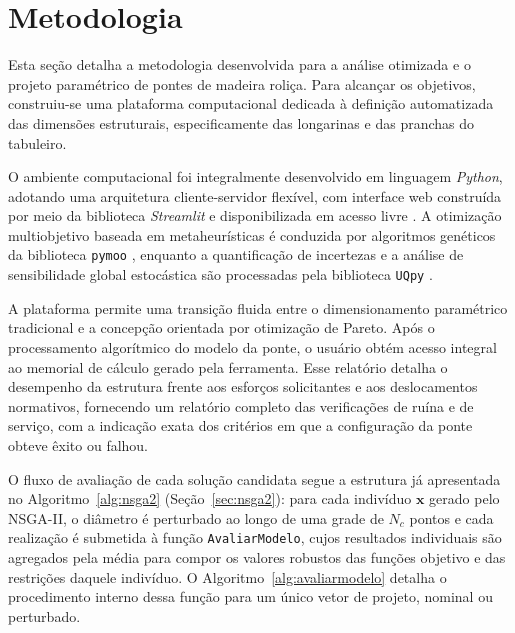 \section{Metodologia}\label{sec:metodologia}

Esta seção detalha a metodologia desenvolvida para a análise otimizada e o projeto paramétrico de pontes de madeira roliça. Para alcançar os objetivos, construiu-se uma plataforma computacional dedicada à definição automatizada das dimensões estruturais, especificamente das longarinas e das pranchas do tabuleiro.

O ambiente computacional foi integralmente desenvolvido em linguagem \textit{Python}, adotando uma arquitetura cliente-servidor flexível, com interface web construída por meio da biblioteca \textit{Streamlit} e disponibilizada em acesso livre \parencite{ReliaBridge2026}.
A otimização multiobjetivo baseada em metaheurísticas é conduzida por algoritmos genéticos da biblioteca \texttt{pymoo} \parencite{blank2020}, enquanto a quantificação de incertezas e a análise de sensibilidade global estocástica são processadas pela biblioteca \texttt{UQpy} \parencite{Olivier2020}.

A plataforma permite uma transição fluida entre o dimensionamento paramétrico tradicional e a concepção orientada por otimização de Pareto.
Após o processamento algorítmico do modelo da ponte, o usuário obtém acesso integral ao memorial de cálculo gerado pela ferramenta.
Esse relatório detalha o desempenho da estrutura frente aos esforços solicitantes e aos deslocamentos normativos, fornecendo um relatório completo das verificações de ruína e de serviço, com a indicação exata dos critérios em que a configuração da ponte obteve êxito ou falhou.

O fluxo de avaliação de cada solução candidata segue a estrutura já apresentada no Algoritmo~\ref{alg:nsga2} (Seção~\ref{sec:nsga2}): para cada indivíduo $\mathbf{x}$ gerado pelo NSGA-II, o diâmetro é perturbado ao longo de uma grade de $N_c$ pontos e cada realização é submetida à função \texttt{AvaliarModelo}, cujos resultados individuais são agregados pela média para compor os valores robustos das funções objetivo e das restrições daquele indivíduo.
O Algoritmo~\ref{alg:avaliarmodelo} detalha o procedimento interno dessa função para um único vetor de projeto, nominal ou perturbado.

